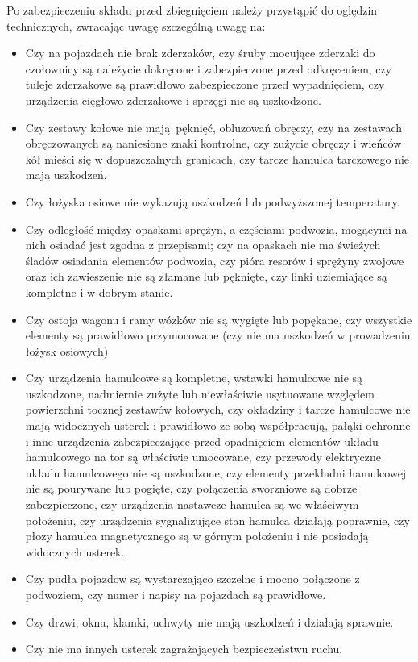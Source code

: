 Po zabezpieczeniu składu przed zbiegnięciem należy przystąpić do oględzin technicznych, zwracając uwagę szczególną uwagę na:
\begin{itemize}
	\item Czy na pojazdach nie brak zderzaków, czy śruby mocujące zderzaki do czołownicy są należycie dokręcone i zabezpieczone przed odkręceniem, czy tuleje zderzakowe są prawidłowo zabezpieczone przed wypadnięciem, czy urządzenia cięgłowo-zderzakowe i sprzęgi nie są uszkodzone.
	\item Czy zestawy kołowe nie mają pęknięć, obluzowań obręczy, czy na zestawach obręczowanych są naniesione znaki kontrolne, czy zużycie obręczy i wieńców kół mieści się w dopuszczalnych granicach, czy tarcze hamulca tarczowego nie mają uszkodzeń.
	\item Czy łożyska osiowe nie wykazują uszkodzeń lub podwyższonej temperatury.
	\item Czy odległość między opaskami sprężyn, a częściami podwozia, mogącymi na nich osiadać jest zgodna z przepisami; czy na opaskach nie ma świeżych śladów osiadania elementów podwozia, czy pióra resorów i sprężyny zwojowe oraz ich zawieszenie nie są złamane lub pęknięte, czy linki uziemiające są kompletne i w dobrym stanie.
	\item Czy ostoja wagonu i ramy wózków nie są wygięte lub popękane, czy wszystkie elementy są prawidłowo przymocowane (czy nie ma uszkodzeń w prowadzeniu łożysk osiowych)
	\item Czy urządzenia hamulcowe są kompletne, wstawki hamulcowe nie są uszkodzone, nadmiernie zużyte lub niewłaściwie usytuowane względem powierzchni tocznej zestawów kołowych, czy okładziny i tarcze hamulcowe nie mają widocznych usterek i prawidłowo ze sobą współpracują, pałąki ochronne i inne urządzenia zabezpieczające przed opadnięciem elementów układu hamulcowego na tor są właściwie umocowane, czy przewody elektryczne układu hamulcowego nie są uszkodzone, czy elementy przekładni hamulcowej nie są pourywane lub pogięte, czy połączenia sworzniowe są dobrze zabezpieczone, czy urządzenia nastawcze hamulca są we właściwym położeniu, czy urządzenia sygnalizujące stan hamulca działają poprawnie, czy płozy hamulca magnetycznego są w górnym położeniu i nie posiadają widocznych usterek.
	\item Czy pudła pojazdow są wystarczająco szczelne i mocno połączone z podwoziem, czy numer i napisy na pojazdach są prawidłowe.
	\item Czy drzwi, okna, klamki, uchwyty nie mają uszkodzeń i działają sprawnie.
	\item Czy nie ma innych usterek zagrażających bezpieczeństwu ruchu. 
\end{itemize}

